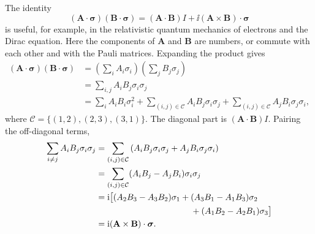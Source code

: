The identity
\[
 \boxed{(\mathbf A\cdot\boldsymbol\sigma)(\mathbf B\cdot\boldsymbol\sigma)
 = (\mathbf A\cdot\mathbf B)I
   +\ii(\mathbf A\times\mathbf B)\cdot\boldsymbol\sigma}
\]
is useful, for example, in the relativistic quantum mechanics of electrons
and the Dirac equation. Here the components of $\mathbf A$ and $\mathbf B$
are numbers, or commute with each other and with the Pauli matrices.
Expanding the product gives
\begin{align*}
 (\mathbf A\cdot\boldsymbol\sigma)(\mathbf B\cdot\boldsymbol\sigma)
 &=\left(\sum_i A_i\sigma_i\right)\left(\sum_j B_j\sigma_j\right)\\
 &=\sum_{i,j}A_iB_j\sigma_i\sigma_j\\
 &=\sum_i A_iB_i\sigma_i^2
   +\sum_{(i,j)\in\mathcal C}A_iB_j\sigma_i\sigma_j
   +\sum_{(i,j)\in\mathcal C}A_jB_i\sigma_j\sigma_i,
\end{align*}
where $\mathcal C=\{(1,2),(2,3),(3,1)\}$. The diagonal part is
$(\mathbf A\cdot\mathbf B)I$. Pairing the off-diagonal terms,
\begin{align*}
 \sum_{i\ne j}A_iB_j\sigma_i\sigma_j
 &=\sum_{(i,j)\in\mathcal C}
    \left(A_iB_j\sigma_i\sigma_j+A_jB_i\sigma_j\sigma_i\right)\\
 &=\sum_{(i,j)\in\mathcal C}(A_iB_j-A_jB_i)\sigma_i\sigma_j\\
 &=\ii\bigl[(A_2B_3-A_3B_2)\sigma_1
 +(A_3B_1-A_1B_3)\sigma_2\\
 &\hspace{39mm}+(A_1B_2-A_2B_1)\sigma_3\bigr]\\
 &=\ii(\mathbf A\times\mathbf B)\cdot\boldsymbol\sigma.
\end{align*}
